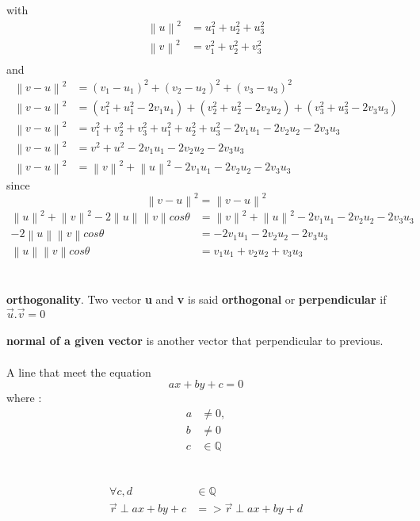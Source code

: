 \documentclass[a4paper, 12pt]{article}
\newcommand{\norm}[1]{\left\lVert#1\right\rVert}
\begin{document}
with\\
\begin{align*}
\norm{u}^2 &= u_1^2 + u_2^2 + u_3^2\\
\norm{v}^2 &= v_1^2 + v_2^2 + v_3^2\\
\end{align*} 
and\\
\begin{align*}
\norm{v - u}^2 &= (v_1 - u_1) ^2 + (v_2 - u_2)^2 + (v_3 - u_3)^2\\ 
\norm{v - u}^2 &= (v_1^2 + u_1^2 -2v_1u_1) + (v_2^2 + u_2^2 -  2v_2u_2) + (v_3^2 + u_3^2 - 2v_3u_3)\\ 
\norm{v - u}^2 & = v_1^2 + v_2^2 + v_3^2 + u_1^2 + u_2^2 + u_3^2 - 2v_1u_1 -2v_2u_2 - 2v_3u_3\\
\norm{v - u}^2 & = v^2 + u^2  - 2v_1u_1 -2v_2u_2 - 2v_3u_3 \\
\norm{v - u}^2 & = \norm{v}^2 + \norm{u}^2  - 2v_1u_1 -2v_2u_2 - 2v_3u_3 
\end{align*} 
since\\
\[
\norm{v - u}^2 = \norm{v - u}^2
\]
\begin{align*}
\norm{u}^2 + \norm{v}^2 - 2\norm{u}\norm{v}cos\theta &=  \norm{v}^2 + \norm{u}^2 - 2v_1u_1 -2v_2u_2 - 2v_3u_3 \\
- 2\norm{u}\norm{v}cos\theta &=  - 2v_1u_1 -2v_2u_2 - 2v_3u_3  \\
\norm{u}\norm{v}cos\theta &=  v_1u_1 + v_2u_2  + v_3u_3 
\end{align*}
\\
\\
\textbf{orthogonality}. Two vector \textbf{u} and \textbf{v} is said \textbf{orthogonal} or \textbf{perpendicular} if  
$\vec{u} . \vec{v} = 0$ 
\\
\\
\textbf{normal of a given vector} is another vector that perpendicular to previous.
\\
\\ 
A line that meet the equation
\[
ax + by + c = 0
\]
where :
\begin{align*}
a &\ne 0,\\ 
b &\ne 0 \\
c &\in \mathbb{Q}
\end{align*} 
\\
\\
\begin{align*}
\forall c,d &\in \mathbb{Q}\\
\vec{r} \perp ax + by + c  &=> \vec{r} \perp ax + by + d
\end{align*} 
\end{document}
